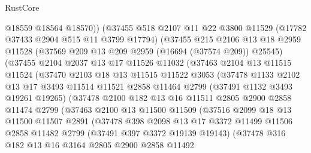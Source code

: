 \begin{lexlean}{RustCore}
\begin{coremodule}
            @18559
            @18564
            @18570))
        (@37455
          @518
          @2107
          @11
          @22
          @3800
          @11529
          (@17782 @37433 @2904 @515 @11 @3799 @17794)
          (@37455
            @215
            @2106
            @13
            @18
            @2959
            @11528
            (@37569 @209 @13 @209 @2959 (@16694 (@37574 @209)) @25545)
            (@37455
              @2104
              @2037
              @13
              @17
              @11526
              @11032
              (@37463
                @2104
                @13
                @11515
                @11524
                (@37470
                  @2103
                  @18
                  @13
                  @11515
                  @11522
                  @3053
                  (@37478
                    @1133
                    @2102
                    @13
                    @17
                    @3493
                    @11514
                    @11521
                    @2858
                    @11464
                    @2799
                    (@37491 @1132 @3493 @19261 @19265)
                    (@37478
                      @2100
                      @182
                      @13
                      @16
                      @11511
                      @2805
                      @2900
                      @2858
                      @11474
                      @2799
                      (@37463
                        @2100
                        @13
                        @11500
                        @11509
                        (@37516
                          @2099
                          @18
                          @13
                          @11500
                          @11507
                          @2891
                          (@37478
                            @398
                            @2098
                            @13
                            @17
                            @3372
                            @11499
                            @11506
                            @2858
                            @11482
                            @2799
                            (@37491 @397 @3372 @19139 @19143)
                            (@37478
                              @316
                              @182
                              @13
                              @16
                              @3164
                              @2805
                              @2900
                              @2858
                              @11492

\end{coremodule}
\end{lexlean}
